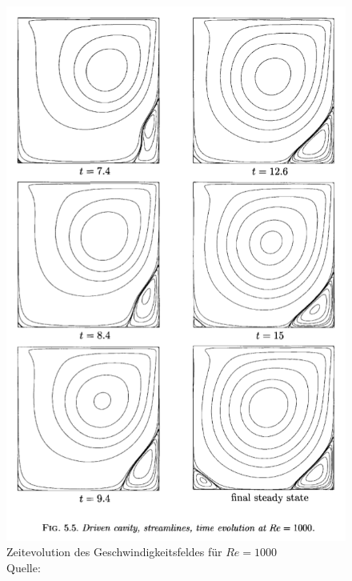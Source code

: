 	\begin{figure}[H]
		\center
		\includegraphics[scale = 0.5]{screenshots/literatur-time-02.png}
		\caption{Zeitevolution des Geschwindigkeitsfeldes für $Re=1000$ \\ Quelle: \cite{nsfd} }
		\label{fig:literatur time 02}
	\end{figure}


